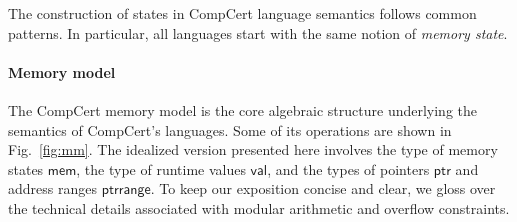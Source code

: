 \documentclass[draft,11pt]{report}
\newcommand{\kw}[1]{\ensuremath{ \mathsf{#1} }}
\begin{document}
%

The construction of states in CompCert language semantics
follows common patterns.
In particular,
all languages start with
the same notion of \emph{memory state}.


\paragraph{Memory model} \label{sec:sem:mm} %

The CompCert memory model \cite{compcertmm,compcertmmv2}
is the core algebraic structure
underlying the semantics of CompCert's languages.
Some of its operations
are shown in Fig.~\ref{fig:mm}.
The idealized version presented here
involves
the type of memory states \kw{mem},
the type of runtime values \kw{val}, and
the types of pointers \kw{ptr} and address ranges \kw{ptrrange}.
To keep our exposition concise and clear,
we gloss over the technical details
associated with modular arithmetic and overflow constraints.
\end{document}
